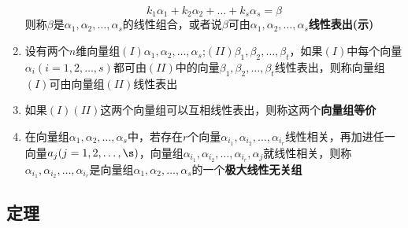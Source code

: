 \documentclass[a4paper,12pt]{article}
\begin{document}
\begin{enumerate}
        \[
            k_{1}\alpha_1 + k_{2}\alpha_2 + \dots + k_{s}\alpha_s = \beta
        \]
        则称$\beta$是$\alpha_1, \alpha_2, \dots, \alpha_s$的线性组合，或者说$\beta$可由$\alpha_1, \alpha_2, \dots, \alpha_s$\textbf{线性表出(示)}
        \item 设有两个$n$维向量组$(I)\alpha_1, \alpha_2, \dots, \alpha_s$;$(II)\beta_1, \beta_2, \dots, \beta_t$，如果$(I)$中每个向量$\alpha_i(i = 1,2,\dots,s)$都可由$(II)$中的向量$\beta_1, \beta_2, \dots, \beta_t$线性表出，则称向量组$(I)$可由向量组$(II)$线性表出
        \item 如果$(I)(II)$这两个向量组可以互相线性表出，则称这两个\textbf{向量组等价}
        \item 在向量组$\alpha_1, \alpha_2, \dots, \alpha_s$中，若存在$r$个向量$\alpha_{i_1}, \alpha_{i_2}, \dots, \alpha_{i_r}$线性相关，再加进任一向量$a_j(j = 1,2,\dots,\s)$，向量组$\alpha_{i_1}, \alpha_{i_2}, \dots, \alpha_{i_r}, \alpha_j$就线性相关，则称$\alpha_{i_1}, \alpha_{i_2}, \dots, \alpha_{i_r}$是向量组$\alpha_1, \alpha_2, \dots, \alpha_s$的一个\textbf{极大线性无关组}
    \end{enumerate}

    \subsection{定理}
\end{document}
